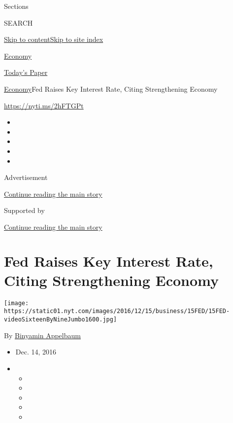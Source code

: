 Sections

SEARCH

\protect\hyperlink{site-content}{Skip to
content}\protect\hyperlink{site-index}{Skip to site index}

\href{https://www.nytimes.com/section/business/economy}{Economy}

\href{https://myaccount.nytimes.com/auth/login?response_type=cookie\&client_id=vi}{}

\href{https://www.nytimes.com/section/todayspaper}{Today's Paper}

\href{/section/business/economy}{Economy}\textbar{}Fed Raises Key
Interest Rate, Citing Strengthening Economy

\url{https://nyti.ms/2hFTGPt}

\begin{itemize}
\item
\item
\item
\item
\item
\end{itemize}

Advertisement

\protect\hyperlink{after-top}{Continue reading the main story}

Supported by

\protect\hyperlink{after-sponsor}{Continue reading the main story}

\hypertarget{fed-raises-key-interest-rate-citing-strengthening-economy}{%
\section{Fed Raises Key Interest Rate, Citing Strengthening
Economy}\label{fed-raises-key-interest-rate-citing-strengthening-economy}}

\texttt{[image: https://static01.nyt.com/images/2016/12/15/business/15FED/15FED-videoSixteenByNineJumbo1600.jpg]}

By \href{http://www.nytimes.com/by/binyamin-appelbaum}{Binyamin
Appelbaum}

\begin{itemize}
\item
  Dec. 14, 2016
\item
  \begin{itemize}
  \item
  \item
  \item
  \item
  \item
  \end{itemize}
\end{itemize}


